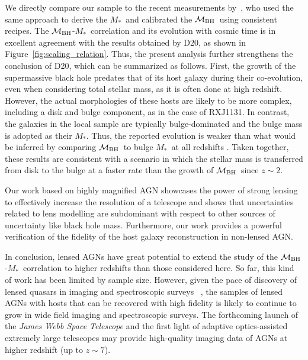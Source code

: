 \documentclass[fleqn,usenatbib]{mnras}
\newcommand{\mbh}{$\mathcal M_{\rm BH}$}
\newcommand{\mstar}{{$M_*$}}
\newcommand{\pink}[1]{{\textcolor{magenta}{#1}}}
\begin{document}
We directly compare our sample to the recent measurements by~\citet[][D20]{Ding2020a}, who used the same approach to derive the \mstar\ and calibrated the \mbh\ using consistent recipes. The \mbh-\mstar\ correlation and its evolution with cosmic time is in excellent agreement with the results obtained by D20, as shown in Figure~\ref{fig:scaling_relation}. Thus, the present analysis further strengthens the conclusion of D20, which can be summarized as follows. First, the growth of the supermassive black hole predates that of its host galaxy during their co-evolution, even when considering total stellar mass, as it is often done at high redshift. However, the actual morphologies of these hosts are likely to be more complex, including a disk and bulge component, as in the case of  RXJ1131. In contrast, the galaxies in the local sample are typically bulge-dominated and the bulge mass is adopted as their  \mstar. Thus, the reported evolution is weaker than what would be inferred by comparing \mbh\ to bulge \mstar\ at all redshifts \citep{Bennert++2011}. Taken together, these results are consistent with a scenario in which the stellar mass is transferred from disk to the bulge at a faster rate than the growth of \mbh\ since $z\sim2$.

Our work based on highly magnified AGN showcases the power of strong lensing to effectively increase the resolution of a telescope and shows that uncertainties related to lens modelling are subdominant with respect to other sources of uncertainty like black hole mass. Furthermore, our work provides a powerful verification of the fidelity of the host galaxy reconstruction in non-lensed AGN. 


In conclusion, lensed AGNs have great potential to extend the study of the \mbh-\mstar\ correlation to higher redshifts than those considered here.  So far, this kind of work has been limited by sample size. However, given the pace of discovery of lensed quasars in imaging and spectroscopic surveys ~\citep[e.g.,][]{Oguri2010, Agn++15,Mor++16,Sch++16,Ost++17,Tre++18, Ang++18, Lem++20}, the samples of lensed AGNs with hosts that can be recovered with high fidelity is likely to continue to grow in wide field imaging and spectroscopic surveys. The forthcoming launch of the {\it James Webb Space Telescope} and the first light of adaptive optics-assisted extremely large telescopes may provide high-quality imaging data of AGNs at higher redshift (up to $z\sim7$).
\end{document}
